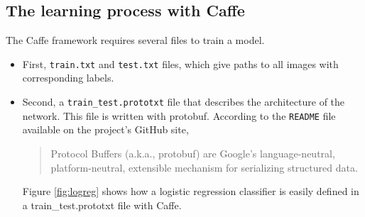 \subsection{The learning process with Caffe}

The Caffe framework requires several files to train a model.
\begin{itemize}
\item First, \texttt{train.txt} and \texttt{test.txt} files, which give paths to all images with corresponding labels.\newline
\item Second, a \texttt{train\_test.prototxt} file that describes the architecture of the network. This file is written with protobuf. According to the \texttt{README} file available on the project's GitHub site, \blockquote{Protocol Buffers (a.k.a., protobuf) are Google's language-neutral, platform-neutral, extensible mechanism for serializing structured data.}. Figure \ref{fig:logreg} shows how a logistic regression classifier is easily defined in a train\_test.prototxt file with Caffe.


\end{itemize}
